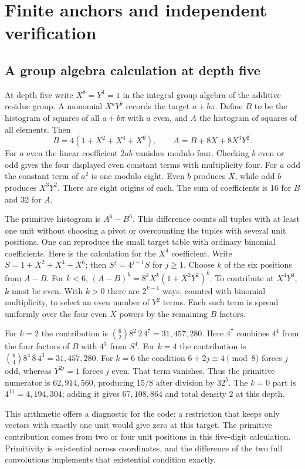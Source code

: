 \documentclass[12pt,letterpaper]{article}
\begin{document}
\section{Finite anchors and independent verification}\subsection{A group algebra calculation at depth five}
At depth five write $X^8=Y^4=1$ in the integral group algebra of the additive residue group. A monomial $X^aY^b$ records the target $a+b\pi$. Define $B$ to be the histogram of squares of all $a+b\pi$ with $a$ even, and $A$ the histogram of squares of all elements. Then
\[
 B=4(1+X^2+X^4+X^6),\qquad A=B+8X+8X^3Y^2.
\]
For $a$ even the linear coefficient $2ab$ vanishes modulo four. Checking $b$ even or odd gives the four displayed even constant terms with multiplicity four. For $a$ odd the constant term of $a^2$ is one modulo eight. Even $b$ produces $X$, while odd $b$ produces $X^3Y^2$. There are eight origins of each. The sum of coefficients is 16 for $B$ and 32 for $A$.
\par
The primitive histogram is $A^6-B^6$. This difference counts all tuples with at least one unit without choosing a pivot or overcounting the tuples with several unit positions. One can reproduce the small target table with ordinary binomial coefficients. Here is the calculation for the $X^4$ coefficient. Write $S=1+X^2+X^4+X^6$; then $S^j=4^{j-1}S$ for $j\ge1$. Choose $k$ of the six positions from $A-B$. For $k<6$, $(A-B)^k=8^kX^k(1+X^2Y^2)^k$. To contribute at $X^4Y^0$, $k$ must be even. With $k>0$ there are $2^{k-1}$ ways, counted with binomial multiplicity, to select an even number of $Y^2$ terms. Each such term is spread uniformly over the four even $X$ powers by the remaining $B$ factors.
\par
For $k=2$ the contribution is $\binom62 8^2\,2\,4^{7}=31{,}457{,}280$. Here $4^7$ combines $4^4$ from the four factors of $B$ with $4^3$ from $S^4$. For $k=4$ the contribution is $\binom64 8^4\,8\,4^3=31{,}457{,}280$. For $k=6$ the condition $6+2j\equiv4\pmod8$ forces $j$ odd, whereas $Y^{2j}=1$ forces $j$ even. That term vanishes. Thus the primitive numerator is $62{,}914{,}560$, producing $15/8$ after division by $32^5$. The $k=0$ part is $4^{11}=4{,}194{,}304$; adding it gives $67{,}108{,}864$ and total density $2$ at this depth.
\par
This arithmetic offers a diagnostic for the code: a restriction that keeps only vectors with exactly one unit would give zero at this target. The primitive contribution comes from two or four unit positions in this five-digit calculation. Primitivity is existential across coordinates, and the difference of the two full convolutions implements that existential condition exactly.
\end{document}
